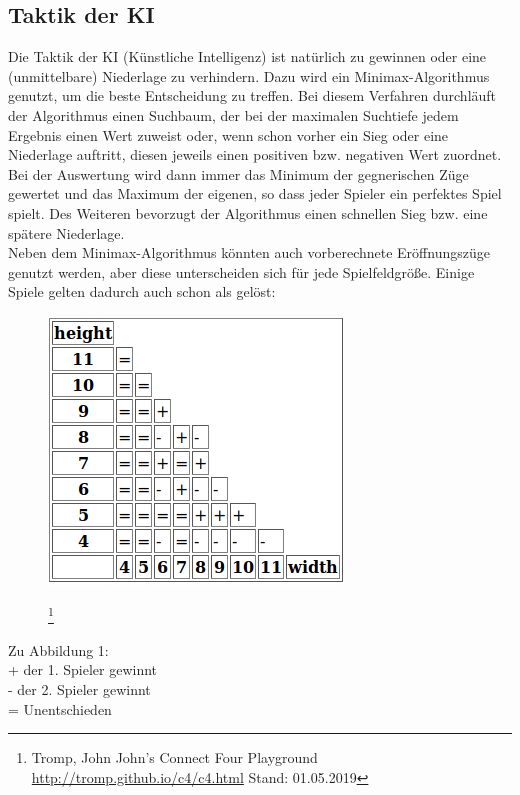 \documentclass[12pt,a4paper,ngerman]{article}
\begin{document}
	\subsection{Taktik der KI}
	Die Taktik der KI (Künstliche Intelligenz) ist natürlich zu gewinnen oder eine (unmittelbare) Niederlage zu verhindern. Dazu wird ein Minimax-Algorithmus genutzt, um die beste Entscheidung zu treffen. Bei diesem Verfahren durchläuft der Algorithmus einen Suchbaum, der bei der maximalen Suchtiefe jedem Ergebnis einen Wert zuweist oder, wenn schon vorher ein Sieg oder eine Niederlage auftritt, diesen jeweils einen positiven bzw. negativen Wert zuordnet. Bei der Auswertung wird dann immer das Minimum der gegnerischen Züge gewertet und das Maximum der eigenen, so dass jeder Spieler ein \glqq perfektes \grqq{} Spiel spielt. Des Weiteren bevorzugt der Algorithmus einen schnellen Sieg bzw. eine spätere Niederlage.
		\\
	Neben dem Minimax-Algorithmus könnten auch vorberechnete Eröffnungszüge genutzt werden, aber diese unterscheiden sich für jede Spielfeldgröße. Einige Spiele gelten dadurch auch schon als gelöst:
	\begin{figure}[h]
		\centering
		\includegraphics[width=0.7\linewidth]{w-h-viergew}
		\caption{}
		\label{fig:w-h-viergew}
		\footnote{Tromp, John  \glqq John's Connect Four Playground \grqq{} \url{http://tromp.github.io/c4/c4.html} Stand: 01.05.2019}
	\end{figure}
    \newpage
	Zu Abbildung 1:\\
	+ der 1. Spieler gewinnt\\
	- der 2. Spieler gewinnt\\
	= Unentschieden\\
	
\end{document}

